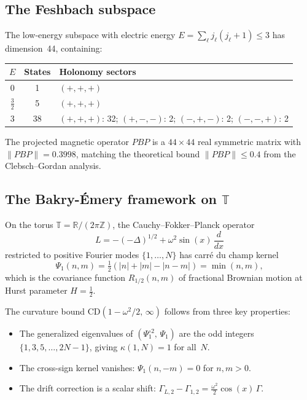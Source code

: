\documentclass[11pt,a4paper]{article}
\theoremstyle{plain}
\theoremstyle{definition}
\theoremstyle{remark}
\newcommand{\R}{\mathbb{R}}
\newcommand{\Z}{\mathbb{Z}}
\newcommand{\T}{\mathbb{T}}
\begin{document}
\subsection{The Feshbach subspace}

The low-energy subspace with electric energy $E = \sum_\ell
j_\ell(j_\ell+1) \le 3$ has dimension~44, containing:

\begin{center}
\begin{tabular}{ccl}
\toprule
$E$ & States & Holonomy sectors \\
\midrule
$0$ & 1 & $(+,+,+)$ \\
$\tfrac{3}{2}$ & 5 & $(+,+,+)$ \\
$3$ & 38 & $(+,+,+)$: 32; $(+,-,-)$: 2; $(-,+,-)$: 2; $(-,-,+)$: 2 \\
\bottomrule
\end{tabular}
\end{center}

The projected magnetic operator $PBP$ is a $44\times 44$ real symmetric
matrix with $\|PBP\| = 0.3998$, matching the theoretical bound
$\|PBP\| \le 0.4$ from the Clebsch--Gordan analysis.

\subsection{The Bakry-\'{E}mery framework on $\T$}

On the torus $\T = \R/(2\pi\Z)$, the Cauchy--Fokker--Planck operator
\begin{equation}
  L = -(-\Delta)^{1/2} + \omega^2 \sin(x)\,\frac{d}{dx}
\end{equation}
restricted to positive Fourier modes $\{1,\ldots,N\}$ has carr\'{e}
du champ kernel
\begin{equation}\label{eq:psi-torus}
  \Psi_1(n,m) = \tfrac{1}{2}(|n| + |m| - |n-m|) = \min(n,m),
\end{equation}
which is the covariance function $R_{1/2}(n,m)$ of fractional Brownian
motion at Hurst parameter $H = \tfrac{1}{2}$.

The curvature bound $\mathrm{CD}(1-\omega^2/2,\,\infty)$ follows from
three key properties:
\begin{itemize}
\item[(i)] The generalized eigenvalues of $(\Psi_1^{\circ 2},\,
  \Psi_1)$ are the odd integers $\{1,3,5,\ldots,2N{-}1\}$, giving
  $\kappa(1,N) = 1$ for all~$N$.
\item[(ii)] The cross-sign kernel vanishes: $\Psi_1(n,-m) = 0$ for
  $n,m > 0$.
\item[(iii)] The drift correction is a scalar shift: $\Gamma_{L,2} -
  \Gamma_{1,2} = \tfrac{\omega^2}{2}\cos(x)\,\Gamma$.
\end{itemize}
\end{document}
